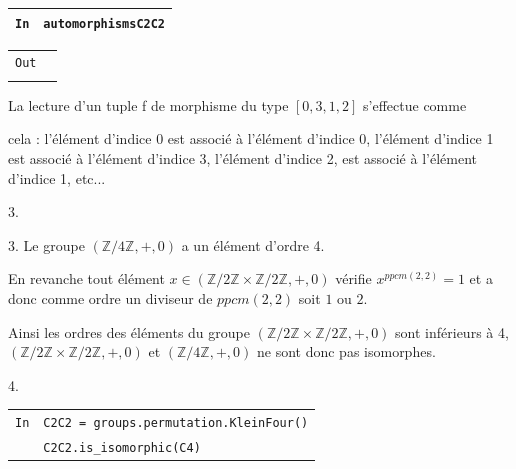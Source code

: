 \documentclass[titlepage]{article}
\begin{document}
    \begin{tabularx}{11.5cm}{|p{0.60cm}|X|}
        \hline
        \verb|In|
        & 
        \verb|automorphismsC2C2|
        \\
        \hline
    \end{tabularx}

    \begin{tabularx}{11.5cm}{|p{0.60cm}|X|}
        \hline
        \verb|Out|
        & 
        \verb|[[0, 1, 2, 3],
        [0, 1, 3, 2],
        [0, 2, 1, 3],
        |
        \\
        \verb||
        &
        \verb|[0, 2, 3, 1],
        [0, 3, 1, 2],
        [0, 3, 2, 1]]|
        \\
        \hline
    \end{tabularx}\newline

    La lecture d'un tuple f de morphisme du type $[0, 3, 1, 2]$ s'effectue comme 
    
    cela : l'élément d'indice 0 est associé à l'élément d'indice 0,
    l'élément d'indice 1 est associé à l'élément d'indice 3, l'élément d'indice 2, est associé à l'élément d'indice 1, etc...
    \newline

    3.

    3. Le groupe $(\mathbb{Z}/4\mathbb{Z}, +, 0)$ a un élément d'ordre 4.\newline
    
    En revanche tout élément $x \in (\mathbb{Z}/2\mathbb{Z} \times \mathbb{Z}/2\mathbb{Z}, +, 0)$ vérifie $x^{ppcm(2,2)} = 1$ et a donc comme ordre un diviseur de $ppcm(2,2)$ soit $1$ ou $2$.\newline
    
    Ainsi les ordres des éléments du groupe $(\mathbb{Z}/2\mathbb{Z} \times \mathbb{Z}/2\mathbb{Z}, +, 0)$ sont inférieurs à 4, $(\mathbb{Z}/2\mathbb{Z} \times \mathbb{Z}/2\mathbb{Z}, +, 0)$ et $(\mathbb{Z}/4\mathbb{Z}, +, 0)$ ne sont donc pas isomorphes.\newline
    
    4.
    \newline


    \begin{tabularx}{11.5cm}{|p{0.60cm}|X|}
        \hline
        \verb|In|
        & 
        \verb|C2C2 = groups.permutation.KleinFour()|
        \\
        \verb||
        &
        \verb|C2C2.is_isomorphic(C4)|
        \\
        \hline
    \end{tabularx}
\end{document}
